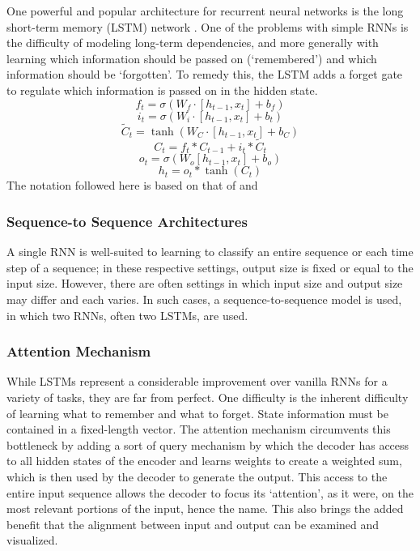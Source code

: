 One powerful and popular architecture for recurrent neural networks is the long
short-term memory (LSTM) network . One of the problems with simple RNNs is the difficulty 
of modeling long-term dependencies, and more generally with learning which information 
should be passed on (`remembered') and which information should be `forgotten'. To remedy 
this, the LSTM adds a forget gate to regulate which information is passed on in the hidden 
state. 
$$f_t = \sigma(W_f \cdot [h_{t-1}, x_t] + b_f)$$
$$i_t = \sigma(W_i \cdot [h_{t-1}, x_t]+b_t)$$
$$\tilde{C}_t = \tanh (W_C \cdot [h_{t-1}, x_t]+b_C)$$
$$C_t = f_t * C_{t-1} + i_t * \tilde{C}_t$$
$$o_t = \sigma (W_o [h_{t-1}, x_t]+b_o)$$
$$h_t = o_t * \tanh (C_t)$$
The notation followed here is based on that of \cite{olah2015} and \cite{lstmtutorial}


\subsubsection{Sequence-to Sequence Architectures}
A single RNN is well-suited to learning to classify an entire sequence or each 
time step of a sequence; in these respective settings, output size is fixed or 
equal to the input size. However, there are often settings in which input size and 
output size may differ and each varies. In such cases, a sequence-to-sequence model 
is used, in which two RNNs, often two LSTMs, are used.
\citep{dlbible}

\subsubsection{Attention Mechanism}
While LSTMs represent a considerable improvement over vanilla RNNs for a variety of tasks, 
they are far from perfect. 
One difficulty is the inherent difficulty of learning what to remember and what to forget.
State information must be contained in a fixed-length vector. 
The attention mechanism circumvents this bottleneck by adding a sort of query mechanism 
by which the decoder has access to all hidden states of the encoder and learns weights to 
create a weighted sum, which is then used by the decoder to generate the output.
This access to the entire input sequence allows the decoder to focus its `attention', 
as it were, on the most relevant portions of the input, hence the name.
This also brings the added benefit that the alignment between input and output 
can be examined and visualized.

